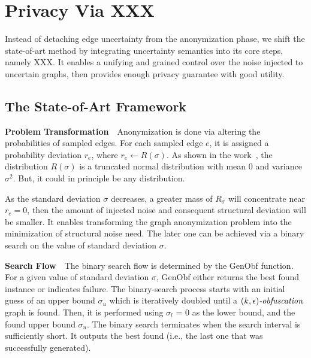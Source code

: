 \section{Privacy Via XXX}
\label{sec:tech}
Instead of detaching edge uncertainty from the anonymization phase, we shift the state-of-art method by integrating uncertainty semantics into its core steps, namely XXX.
It enables a unifying and grained control over the noise injected to uncertain graphs, then provides enough privacy guarantee with good utility.

\subsection{The State-of-Art Framework}
\textbf{Problem Transformation}~~Anonymization is done via altering the probabilities of sampled edges. For each sampled edge $e$, it is assigned a probability deviation $r_{e}$, where $r_{e} \leftarrow R(\sigma)$. As shown in the work~\cite{Boldi_Injecting_2012}, the distribution $R(\sigma)$ is a truncated normal distribution with mean 0 and variance $\sigma^2$. But, it could in principle be any distribution. 

As the standard deviation $\sigma$ decreases, a greater mass of $R_{\sigma}$ will concentrate near $r_{e}=0$, then the amount of injected noise and consequent structural deviation will be smaller. It enables transforming the graph anonymization problem into the minimization of structural noise need. The later one can be achieved via a binary search on the value of standard deviation $\sigma$.


\textbf{Search Flow}~~The binary search flow is determined by the \textmd{GenObf} function. For a given value of standard deviation $\sigma$, \textmd{GenObf} either returns the best found {\keobf} instance or indicates failure. 
The binary-search process starts with an initial guess of an upper bound $\sigma_{u}$ which is iteratively doubled until a ${\textit{$(k,\epsilon)$-obfuscation}}$ graph is found. Then, it is performed using $\sigma_{l}$ = 0 as the lower bound, and the found upper bound $\sigma_{u}$. The binary search terminates when the search interval is sufficiently short. It outputs the best {\keobf} found (i.e., the
 last one that was successfully generated).



